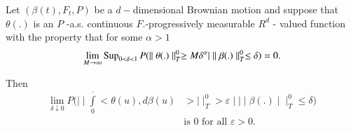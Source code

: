 \setcounter{lemma}{17}
\begin{lemma}\label{chap2:lem4.18} %
Let $ ( \beta (t), F_t, P ) $ be a $d-$dimensional Brownian motion and
suppose that $ \theta (.) $  is an  $P$ -a.s. continuous
$F.$-progressively measurable $R^d$ - valued function with the property 
that for some $ \alpha > 1 $ 
$$
\lim_{M \rightarrow \infty} \operatorname{Sup}_{ 0 < \delta < 1}  P ( \mid\mid 
\theta (.) \mid\mid^0_T \ge  M \delta^\alpha|  \mid\mid \beta
(.) \mid\mid^0_T \leq \delta ) = 0. 
$$

Then 
\begin{align*}
\lim_{ \delta \downarrow 0}  P ( \mid\mid \int\limits^{\cdot}_{0} <
\theta (u),  d \beta (u) & > \mid\mid^0_T > \varepsilon \mid  \mid\mid
\beta (.) \mid\mid^0_T \leq \delta )\\
&  \text{is 0 for all } \varepsilon > 0 . 
\end{align*}
\end{lemma}

